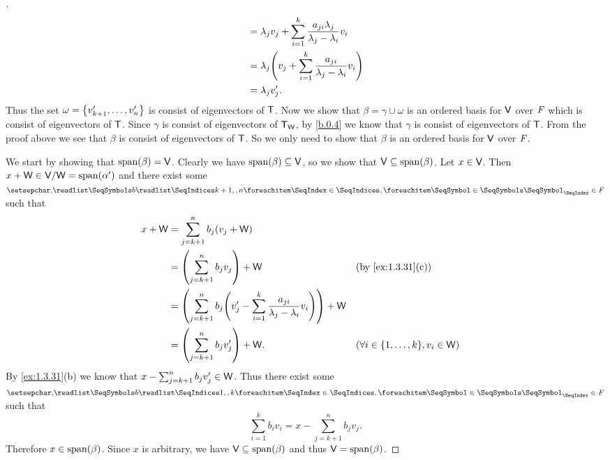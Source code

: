 \begin{proof}[]
\begin{align*}
             & = \lambda_j v_j + \sum_{i = 1}^k \frac{a_{j i} \lambda_j}{\lambda_j - \lambda_i} v_i                                                               \\
             & = \lambda_j \pa{v_j + \sum_{i = 1}^k \frac{a_{j i}}{\lambda_j - \lambda_i} v_i}                                                                    \\
             & = \lambda_j v_j'.
  \end{align*}
  Thus the set \(\omega = \left\lbrace v_{k + 1}', \dots, v_n'\right\rbrace\) is consist of eigenvectors of \(\mathsf{T}\).
  Now we show that \(\beta = \gamma \cup \omega\) is an ordered basis for \(\mathsf{V}\) over \(\mathit{F}\) which is consist of eigenvectors of \(\mathsf{T}\).
  Since \(\gamma\) is consist of eigenvectors of \(\mathsf{T}_{\mathsf{W}}\), by \cref{b.0.4} we know that \(\gamma\) is consist of eigenvectors of \(\mathsf{T}\).
  From the proof above we see that \(\beta\) is consist of eigenvectors of \(\mathsf{T}\).
  So we only need to show that \(\beta\) is an ordered basis for \(\mathsf{V}\) over \(\mathit{F}\).

  We start by showing that \(\spn{\beta} = \V\).
  Clearly we have \(\spn{\beta} \subseteq \V\), so we show that \(\V \subseteq \spn{\beta}\).
  Let \(x \in \mathsf{V}\).
  Then \(x + \W \in \V / \W = \spn{\alpha'}\) and there exist some \(\seq{b}{k+1,,n} \in \F\) such that
  \begin{align*}
    x + \W & = \sum_{j = k + 1}^n b_j (v_j + \W)                                                                                                                        \\
           & = \pa{\sum_{j = k + 1}^n b_j v_j} + \W                                                                  &  & \text{(by \cref{ex:1.3.31}(c))}               \\
           & = \pa{\sum_{j = k + 1}^n b_j \pa{v_j' - \sum_{i = 1}^k \frac{a_{j i}}{\lambda_j - \lambda_i} v_i}} + \W                                                    \\
           & = \pa{\sum_{j = k + 1}^n b_j v_j'} + \W.                                                                &  & (\forall i \in \set{1, \dots, k}, v_i \in \W)
  \end{align*}
  By \cref{ex:1.3.31}(b) we know that \(x - \sum_{j = k + 1}^n b_j v_j' \in \mathsf{W}\).
  Thus there exist some \(\seq{b}{1,,k} \in \F\) such that
  \[
    \sum_{i = 1}^k b_i v_i = x - \sum_{j = k + 1}^n b_j v_j.
  \]
  Therefore \(x \in \spn{\beta}\).
  Since \(x\) is arbitrary, we have \(\V \subseteq \spn{\beta}\) and thus \(\V = \spn{\beta}\).


\end{proof}
